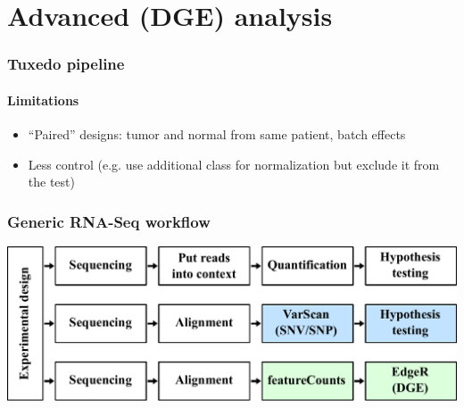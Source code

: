 \documentclass{beamer}			  %
\begin{document}
\section{Advanced (DGE) analysis}

\begin{frame}
\frametitle{Tuxedo pipeline}
\framesubtitle{Limitations}
	\begin{itemize}
		\item ``Paired'' designs: tumor and normal from same patient, batch effects
		\item Less control (e.g. use additional class for normalization but exclude it from the test)
	\end{itemize}
\end{frame}

\begin{frame}
\frametitle{Generic RNA-Seq workflow}
	\begin{center}
		\includegraphics[width=\textwidth]{figures/dge_08p.pdf}
	\end{center}
\end{frame}

\end{document}
